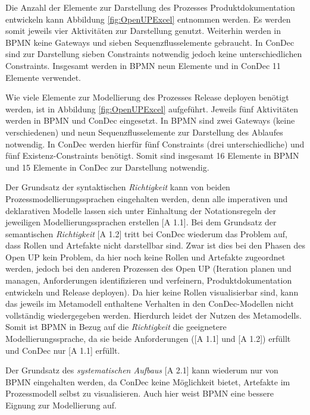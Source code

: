 Die Anzahl der Elemente zur Darstellung des Prozesses Produktdokumentation entwickeln kann Abbildung \ref{fig:OpenUPExcel} entnommen werden. Es werden somit jeweils vier Aktivitäten zur Darstellung genutzt. Weiterhin werden in BPMN keine Gateways und sieben Sequenzflusselemente gebraucht. In ConDec sind zur Darstellung sieben Constraints notwendig jedoch keine unterschiedlichen Constraints. Insgesamt werden in BPMN neun Elemente und in ConDec 11 Elemente verwendet.\newline


Wie viele Elemente zur Modellierung des Prozesses Release deployen benötigt werden, ist in Abbildung \ref{fig:OpenUPExcel} aufgeführt. Jeweils fünf Aktivitäten werden in BPMN und ConDec eingesetzt. In BPMN sind zwei Gateways (keine verschiedenen) und neun Sequenzflusselemente zur Darstellung des Ablaufes notwendig. In ConDec werden hierfür fünf Constraints (drei unterschiedliche)  und fünf Existenz-Constraints benötigt. Somit sind insgesamt 16 Elemente in BPMN und 15 Elemente in ConDec zur Darstellung notwendig. \newline


Der Grundsatz der syntaktischen \textit{Richtigkeit} kann von beiden Prozessmodellierungssprachen eingehalten werden, denn alle imperativen und deklarativen Modelle lassen sich unter Einhaltung der Notationsregeln der jeweiligen Modellierungssprachen erstellen [A 1.1].\newline
Bei dem Grundsatz der semantischen \textit{Richtigkeit} [A 1.2] tritt bei ConDec wiederum das Problem auf, dass Rollen und Artefakte nicht darstellbar sind. Zwar ist dies bei den Phasen des Open UP kein Problem, da hier noch keine Rollen und Artefakte zugeordnet werden, jedoch bei den anderen Prozessen des Open UP (Iteration planen und managen, Anforderungen identifizieren und verfeinern, Produktdokumentation entwickeln und Release deployen). Da hier keine Rollen visualisierbar sind, kann das jeweils im Metamodell enthaltene Verhalten in den ConDec-Modellen nicht vollständig wiedergegeben werden. Hierdurch leidet der Nutzen des Metamodells. \newline
Somit ist BPMN in Bezug auf die \textit{Richtigkeit} die geeignetere Modellierungssprache, da sie beide Anforderungen ([A 1.1] und [A 1.2]) erfüllt und ConDec nur [A 1.1] erfüllt.\newline

Der Grundsatz des \textit{systematischen Aufbaus} [A 2.1] kann wiederum nur von BPMN eingehalten werden, da ConDec keine Möglichkeit bietet, Artefakte im Prozessmodell selbst zu visualisieren.\newline
Auch hier weist BPMN eine bessere Eignung zur Modellierung auf.\newline

